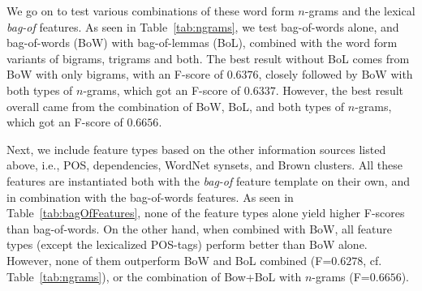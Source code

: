 \documentclass[11pt,letterpaper]{article}
\begin{document}
We go on to test various combinations of these word form $n$-grams and the lexical \emph{bag-of} features. As seen in Table~\ref{tab:ngrams}, we test bag-of-words alone, and bag-of-words (BoW) with bag-of-lemmas (BoL), combined with the word form variants of bigrams, trigrams and both. The best result without BoL comes from BoW with only bigrams, with an F-score of $0.6376$, closely followed by BoW with both types of $n$-grams, which got an F-score of $0.6337$. However, the best result overall came from the combination of BoW, BoL, and both types of $n$-grams, which got an F-score of $0.6656$.

Next, we include feature types based on the other information sources listed above, i.e., POS, dependencies, WordNet synsets, and Brown clusters. All these features are instantiated both with the \emph{bag-of} feature template on their own, and in combination with the bag-of-words features. As seen in Table~\ref{tab:bagOfFeatures}, none of the feature types alone yield higher F-scores than bag-of-words. On the other hand, when combined with BoW, all feature types (except the lexicalized POS-tags) perform better than BoW alone. However, none of them outperform BoW and BoL combined (F=$0.6278$, cf. Table~\ref{tab:ngrams}), or the combination of Bow+BoL with $n$-grams (F=$0.6656$).
\end{document}
